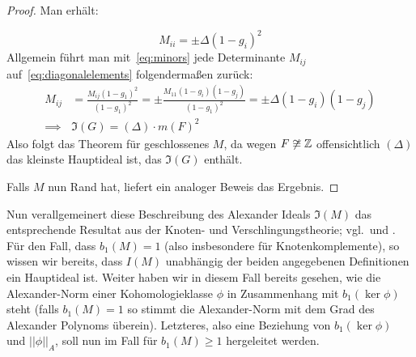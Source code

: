 \begin{proof}
	Man erhält:
	
	\begin{equation}
		M_{ii}= \pm \Delta (1-g_i)^2 \label{eq:diagonalelements}
	\end{equation}
	Allgemein führt man mit~\eqref{eq:minors} jede Determinante $M_{ij}$ auf~\eqref{eq:diagonalelements} folgendermaßen zurück:
	\begin{align*}
		M_{ij} &= \frac{M_{ij}(1-g_1)^2}{(1-g_1)^2} 
				= \pm \frac{M_{11}(1-g_i)(1-g_j)}{(1-g_1)^2}
				= \pm \Delta (1-g_i)(1-g_j)\\
		\implies &\mathfrak I(G) = (\Delta) \cdot m(F)^2 
	\end{align*}
	Also folgt das Theorem für geschlossenes $M$, da wegen $F\not\cong\mathbb{Z}$ offensichtlich $(\Delta)$ das kleinste Hauptideal ist, das $\mathfrak I(G)$ enthält.

	Falls $M$ nun Rand hat, liefert ein analoger Beweis das Ergebnis. 
\end{proof} 
Nun verallgemeinert diese Beschreibung des Alexander Ideals $\mathfrak I(M)$ das entsprechende Resultat aus der Knoten- und Verschlingungstheorie; vgl.\,\cite[Proposition~8.11]{Burde.2003} und \cite[Proposition~9.16]{Burde.2003}. Für den Fall, dass $b_1(M)=1$ (also insbesondere für Knotenkomplemente), so wissen wir bereits, dass $I(M)$ unabhängig der beiden angegebenen Definitionen ein Hauptideal ist. Weiter haben wir in diesem Fall bereits gesehen, wie die Alexander-Norm einer Kohomologieklasse $\phi$ in Zusammenhang mit $b_1(\ker \phi)$ steht (falls $b_1(M)=1$ so stimmt die Alexander-Norm mit dem Grad des Alexander Polynoms überein). Letzteres, also eine Beziehung von $b_1(\ker\phi)$ und $||\phi||_A$, soll nun im Fall für $b_1(M)\geq 1$ hergeleitet werden.


